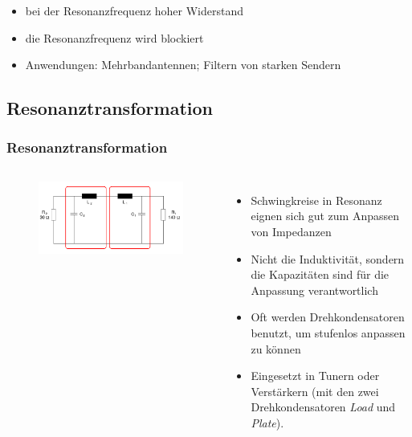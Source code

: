 \begin{frame}
\begin{columns}
\begin{center}
\begin{figure}
      \end{figure}
    \end{center}
  \end{columns}
  \pause
  \begin{itemize}
    \item bei der Resonanzfrequenz hoher Widerstand
    \item die Resonanzfrequenz wird blockiert
    \item Anwendungen: Mehrbandantennen; Filtern von starken Sendern
  \end{itemize}
\end{frame}

\subsection*{Resonanz\-trans\-formation}
\begin{frame}
  \frametitle{Resonanztransformation}
  \begin{columns}
    \begin{center}
      \begin{figure}
        \includegraphics[width=\textwidth,height=.75\textheight,keepaspectratio]{a04/Pi-Filter.png}\\
      \end{figure}
    \end{center}
    \begin{itemize}
      \item Schwingkreise in Resonanz eignen sich gut zum Anpassen von Impedanzen
      \item Nicht die Induktivität, sondern die Kapazitäten sind für die Anpassung verantwortlich
      \item Oft werden Drehkondensatoren benutzt, um stufenlos anpassen zu können
      \item Eingesetzt in Tunern oder Verstärkern (mit den zwei Drehkondensatoren \emph{Load} und \emph{Plate}).
    \end{itemize}
  \end{columns}
\end{frame}


